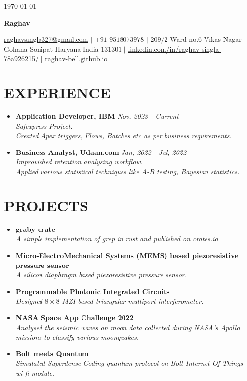 \documentclass[12pt]{my_cv}
\begin{document}
\begin{flushright}
\today
\end{flushright}
\begin{center}
\textbf{\Huge Raghav}

\href {mailto:raghavsingla327@gmail.com}{raghavsingla327@gmail.com} $|$ $+91$-$9518073978$ $|$ $209/2$ Ward no.$6$ Vikas Nagar Gohana Sonipat Haryana India $131301$ $|$
\href{https://linkedin.com/in/raghav-singla-78a926215/}{linkedin.com/in/raghav-singla-78a926215/} $|$  \href{https://raghav-bell.github.io}{raghav-bell.github.io}

\end{center}
\section{EXPERIENCE}
\begin{itemize}
\item \textbf{Application Developer, IBM} \hfill \textit{Nov, 2023 - Current}
\\\textit{Safexpress Project.
\\Created Apex triggers, Flows, Batches etc as per business requirements.}
\item \textbf{Business Analyst, Udaan.com} \hfill \textit{Jan, 2022 - Jul, 2022}
\\\textit{Improvished retention analysing workflow.
\\Applied various statistical techniques like A-B testing, Bayesian statistics.}

\end{itemize}
\section{PROJECTS}
\begin{itemize}
\item \textbf{graby crate}
\\ \textit{A simple implementation of grep in rust and published on \href{https://crates.io/crates/graby}{crates.io}}
\item \textbf{Micro-ElectroMechanical Systems (MEMS) based piezoresistive pressure sensor}
\\\textit{A silicon diaphragm based piezoresistive pressure sensor.}
\item \textbf{Programmable Photonic Integrated Circuits}
\\\textit{Designed $8 \times 8$ MZI based triangular multiport interferometer.}
\item \textbf{NASA Space App Challenge 2022}
\\\textit{Analysed the seismic waves on moon data collected during NASA’s Apollo missions to classify various moonquakes.}
\item \textbf{Bolt meets Quantum}
\\\textit{Simulated Superdense Coding quantum protocol on Bolt Internet Of Things wi-fi module.}
\end{itemize}
\end{document}
